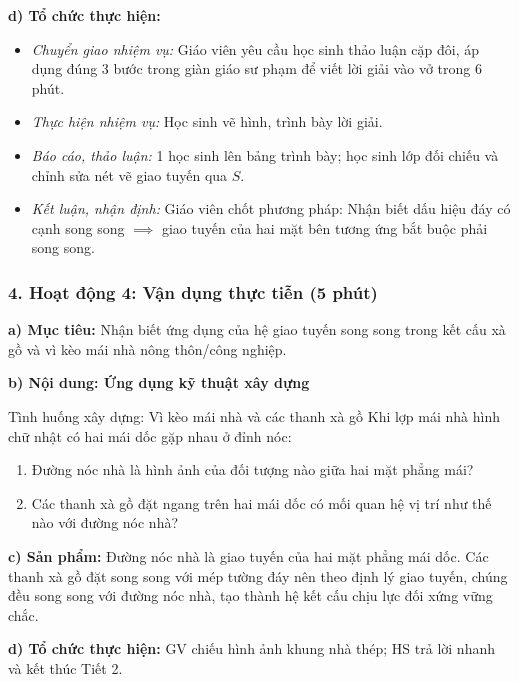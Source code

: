 \documentclass[12pt, a4paper]{article}
\begin{document}
\noindent \textbf{d) Tổ chức thực hiện:}
\begin{itemize}[leftmargin=0.8cm]
    \item \textit{Chuyển giao nhiệm vụ:} Giáo viên yêu cầu học sinh thảo luận cặp đôi, áp dụng đúng 3 bước trong giàn giáo sư phạm để viết lời giải vào vở trong 6 phút.
    \item \textit{Thực hiện nhiệm vụ:} Học sinh vẽ hình, trình bày lời giải.
    \item \textit{Báo cáo, thảo luận:} 1 học sinh lên bảng trình bày; học sinh lớp đối chiếu và chỉnh sửa nét vẽ giao tuyến qua $S$.
    \item \textit{Kết luận, nhận định:} Giáo viên chốt phương pháp: Nhận biết dấu hiệu đáy có cạnh song song $\implies$ giao tuyến của hai mặt bên tương ứng bắt buộc phải song song.
\end{itemize}

\subsubsection*{4. Hoạt động 4: Vận dụng thực tiễn (5 phút)}

\noindent \textbf{a) Mục tiêu:}
Nhận biết ứng dụng của hệ giao tuyến song song trong kết cấu xà gồ và vì kèo mái nhà nông thôn/công nghiệp.

\noindent \textbf{b) Nội dung: Ứng dụng kỹ thuật xây dựng}
\begin{pedabox}{Tình huống xây dựng: Vì kèo mái nhà và các thanh xà gồ}
Khi lợp mái nhà hình chữ nhật có hai mái dốc gặp nhau ở đỉnh nóc:
\begin{enumerate}[leftmargin=0.6cm]
    \item Đường nóc nhà là hình ảnh của đối tượng nào giữa hai mặt phẳng mái?
    \item Các thanh xà gồ đặt ngang trên hai mái dốc có mối quan hệ vị trí như thế nào với đường nóc nhà?
\end{enumerate}
\end{pedabox}

\noindent \textbf{c) Sản phẩm:}
Đường nóc nhà là giao tuyến của hai mặt phẳng mái dốc. Các thanh xà gồ đặt song song với mép tường đáy nên theo định lý giao tuyến, chúng đều song song với đường nóc nhà, tạo thành hệ kết cấu chịu lực đối xứng vững chắc.

\noindent \textbf{d) Tổ chức thực hiện:}
GV chiếu hình ảnh khung nhà thép; HS trả lời nhanh và kết thúc Tiết 2.

\newpage
\end{document}
